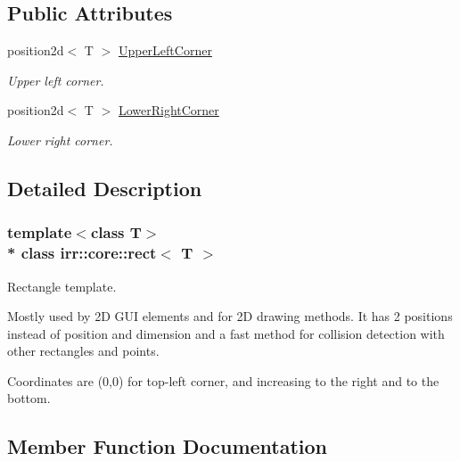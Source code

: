 \subsection*{Public Attributes}
\begin{DoxyCompactItemize}
\item 
position2d$<$ T $>$ \hyperlink{classirr_1_1core_1_1rect_abd47b3a4967b2153e58984d964af6573}{Upper\+Left\+Corner}\hypertarget{classirr_1_1core_1_1rect_abd47b3a4967b2153e58984d964af6573}{}\label{classirr_1_1core_1_1rect_abd47b3a4967b2153e58984d964af6573}

\begin{DoxyCompactList}\small\item\em Upper left corner. \end{DoxyCompactList}\item 
position2d$<$ T $>$ \hyperlink{classirr_1_1core_1_1rect_aa7c7e38bbff5f32992f69b36fc8cec1e}{Lower\+Right\+Corner}\hypertarget{classirr_1_1core_1_1rect_aa7c7e38bbff5f32992f69b36fc8cec1e}{}\label{classirr_1_1core_1_1rect_aa7c7e38bbff5f32992f69b36fc8cec1e}

\begin{DoxyCompactList}\small\item\em Lower right corner. \end{DoxyCompactList}\end{DoxyCompactItemize}


\subsection{Detailed Description}
\subsubsection*{template$<$class T$>$\\*
class irr\+::core\+::rect$<$ T $>$}

Rectangle template. 

Mostly used by 2D G\+UI elements and for 2D drawing methods. It has 2 positions instead of position and dimension and a fast method for collision detection with other rectangles and points.

Coordinates are (0,0) for top-\/left corner, and increasing to the right and to the bottom. 

\subsection{Member Function Documentation}
